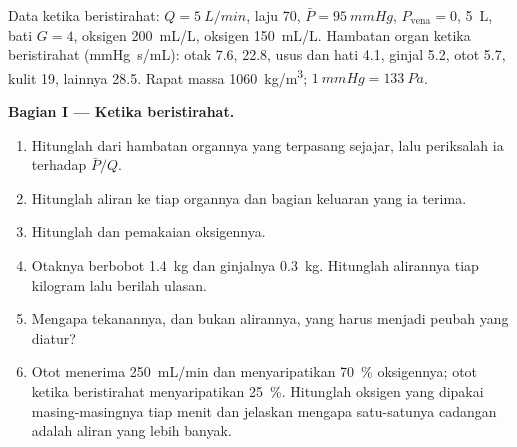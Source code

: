 \begin{problem}
\label{pb:b2:blood-pressure:1}
Data ketika beristirahat: $Q = \qty{5}{L/min}$, laju 70, $\bar P = \qty{95}{mmHg}$,
$P_{\text{vena}} = 0$,  \qty{5}{L}, bati  $G = 4$,
oksigen  \qty{200}{mL/L}, oksigen  \qty{150}{mL/L}. Hambatan
organ ketika beristirahat (\unit{mmHg.s/mL}): otak 7.6,  22.8,
usus dan hati 4.1, ginjal 5.2, otot 5.7, kulit 19, lainnya 28.5. Rapat
massa  \qty{1060}{kg/m^3}; $\qty{1}{mmHg} = \qty{133}{Pa}$.

\medskip
\noindent\textbf{Bagian I --- Ketika beristirahat.}
\begin{enumerate}
  \item Hitunglah  dari hambatan organnya yang
        terpasang sejajar, lalu periksalah ia terhadap $\bar P/Q$.
  \item Hitunglah aliran ke tiap organnya dan bagian keluaran yang ia
        terima.
  \item Hitunglah  dan pemakaian oksigennya.
  \item Otaknya berbobot \qty{1.4}{kg} dan ginjalnya \qty{0.3}{kg}.
        Hitunglah alirannya tiap kilogram lalu berilah ulasan.
  \item Mengapa tekanannya, dan bukan alirannya, yang harus menjadi
        peubah yang diatur?
  \item Otot  menerima \qty{250}{mL/min} dan menyaripatikan
        \qty{70}{\%} oksigennya; otot ketika beristirahat
        menyaripatikan \qty{25}{\%}. Hitunglah oksigen yang dipakai
        masing-masingnya tiap menit dan jelaskan mengapa satu-satunya
        cadangan  adalah aliran yang lebih banyak.
\end{enumerate}


\end{problem}

